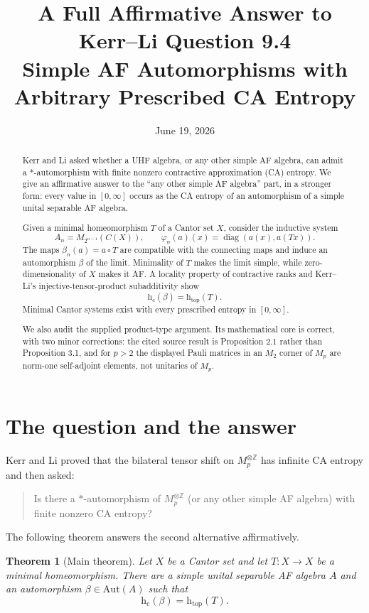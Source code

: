\documentclass[11pt]{article}
\title{A Full Affirmative Answer to Kerr--Li Question 9.4\\
\large Simple AF Automorphisms with Arbitrary Prescribed CA Entropy}
\author{}
\date{June 19, 2026}
\newtheorem{theorem}{Theorem}[section]
\theoremstyle{remark}
\newcommand{\hc}{\mathrm{h}_{\mathrm c}}
\newcommand{\htop}{\mathrm{h}_{\mathrm{top}}}
\newcommand{\Aut}{\mathrm{Aut}}
\newcommand{\Z}{\mathbb Z}
\begin{document}
\maketitle

\begin{abstract}
Kerr and Li asked whether a UHF algebra, or any other simple AF algebra,
can admit a $*$-automorphism with finite nonzero contractive approximation
(CA) entropy.  We give an affirmative answer to the ``any other simple AF
algebra'' part, in a stronger form: every value in $[0,\infty]$ occurs as the
CA entropy of an automorphism of a simple unital separable AF algebra.

Given a minimal homeomorphism $T$ of a Cantor set $X$, consider the
inductive system
\[
 A_n=M_{2^{n-1}}(C(X)),\qquad
 \varphi_n(a)(x)=\operatorname{diag}(a(x),a(Tx)).
\]
The maps $\beta_n(a)=a\circ T$ are compatible with the connecting maps and
induce an automorphism $\beta$ of the limit.  Minimality of $T$ makes the
limit simple, while zero-dimensionality of $X$ makes it AF.  A locality
property of contractive ranks and Kerr--Li's injective-tensor-product
subadditivity show
\[
 \hc(\beta)=\htop(T).
\]
Minimal Cantor systems exist with every prescribed entropy in
$[0,\infty]$.

We also audit the supplied product-type argument.  Its mathematical core is
correct, with two minor corrections: the cited source result is Proposition
2.1 rather than Proposition 3.1, and for $p>2$ the displayed Pauli matrices
in an $M_2$ corner of $M_p$ are norm-one self-adjoint elements, not unitaries
of $M_p$.
\end{abstract}

\section{The question and the answer}

Kerr and Li proved that the bilateral tensor shift on
$M_p^{\otimes \Z}$ has infinite CA entropy and then asked:

\begin{quote}
Is there a $*$-automorphism of $M_p^{\otimes\Z}$ (or any other simple AF
algebra) with finite nonzero CA entropy?
\end{quote}

The following theorem answers the second alternative affirmatively.

\begin{theorem}[Main theorem]\label{thm:main}
Let $X$ be a Cantor set and let $T\colon X\to X$ be a minimal
homeomorphism.  There are a simple unital separable AF algebra $A$ and an
automorphism $\beta\in\Aut(A)$ such that
\[
   \hc(\beta)=\htop(T).
\]
\end{theorem}
\end{document}
